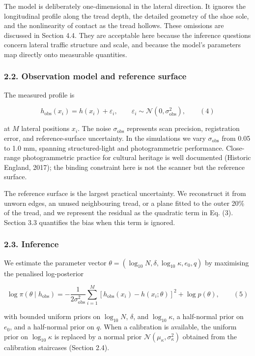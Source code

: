 \documentclass[
]{article}
\begin{document}
The model is deliberately one-dimensional in the lateral direction. It
ignores the longitudinal profile along the tread depth, the detailed
geometry of the shoe sole, and the nonlinearity of contact as the tread
hollows. These omissions are discussed in Section 4.4. They are
acceptable here because the inference questions concern lateral traffic
structure and scale, and because the model's parameters map directly
onto measurable quantities.

\subsubsection{2.2. Observation model and reference
surface}\label{observation-model-and-reference-surface}

The measured profile is

\[
h_{\mathrm{obs}}(x_i)=h(x_i)+\varepsilon_i,
\qquad \varepsilon_i\sim\mathcal{N}(0,\sigma_{\mathrm{obs}}^2),
\qquad (4)
\]

at \(M\) lateral positions \(x_i\). The noise \(\sigma_{\mathrm{obs}}\)
represents scan precision, registration error, and reference-surface
uncertainty. In the simulations we vary \(\sigma_{\mathrm{obs}}\) from
0.05 to 1.0 mm, spanning structured-light and photogrammetric
performance. Close-range photogrammetric practice for cultural heritage
is well documented (Historic England, 2017); the binding constraint here
is not the scanner but the reference surface.

The reference surface is the largest practical uncertainty. We
reconstruct it from unworn edges, an unused neighbouring tread, or a
plane fitted to the outer 20\% of the tread, and we represent the
residual as the quadratic term in Eq. (3). Section 3.3 quantifies the
bias when this term is ignored.

\subsubsection{2.3. Inference}\label{inference}

We estimate the parameter vector
\(\theta=(\log_{10}N,\delta,\log_{10}\kappa,e_0,q)\) by maximising the
penalised log-posterior

\[
\log \pi(\theta\mid h_{\mathrm{obs}})
=-\frac{1}{2\sigma_{\mathrm{obs}}^2}\sum_{i=1}^{M}\left[h_{\mathrm{obs}}(x_i)-h(x_i;\theta)\right]^2
+\log p(\theta),
\qquad (5)
\]

with bounded uniform priors on \(\log_{10}N\), \(\delta\), and
\(\log_{10}\kappa\), a half-normal prior on \(e_0\), and a half-normal
prior on \(q\). When a calibration is available, the uniform prior on
\(\log_{10}\kappa\) is replaced by a normal prior
\(\mathcal{N}(\mu_\kappa,\sigma_\kappa^2)\) obtained from the
calibration staircases (Section 2.4).
\end{document}
